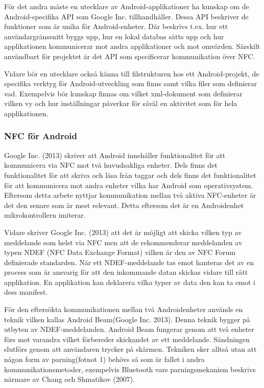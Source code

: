 \documentclass[11pt]{article}
\begin{document}

För det andra måste en utecklare av Android-applikationer ha kunskap om de Android-specifika API som Google Inc. tillhandhåller. Dessa API beskriver de funktioner som är unika för Android-enheter. Där beskrivs t.ex. hur ett användargränssnitt byggs upp, hur en lokal databas sätts upp och hur applikationen kommunicerar mot andra applikationer och mot omvärden. Särskilt användbart för projektet är det API som specificerar kommunikation över NFC.

Vidare bör en utecklare också känna till filstrukturen hos ett Android-projekt, de specifika verktyg för Android-utveckling som finns samt vilka filer som definierar vad. Exempelvis bör kunskap finnas om vilket xml-dokument som definierar vilken vy och hur inställningar påverkar för såväl en aktivitet som för hela applikationen.

\subsubsection{NFC för Android}
Google Inc. (2013) skriver att Android innehåller funktionalitet för att kommunicera via NFC mot två huvudsakliga enheter. Dels finns det funktionalitet för att skriva och läsa från taggar och dels finns det funktionalitet för att kommunicera mot andra enheter vilka har Android som operativsystem. Eftersom detta arbete nyttjar kommunikation mellan två aktiva NFC-enheter är det den senare som är mest relevant. Detta eftersom det är en Androidenhet mikrokontrollern imiterar.

Vidare skriver Google Inc. (2013) att det är möjligt att skicka vilken typ av meddelande som helst via NFC men att de rekommenderar meddelanden av typen NDEF (NFC Data Exchange Format) vilken är den av NFC Forum definierade standarden. När ett NDEF-meddelande tas emot hanteras det av en process som är ansvarig för att den inkommande datan skickas vidare till rätt applikation. En applikation kan deklarera vilka typer av data den kan ta emot i dess manifest.

För den eftersökta kommunikationen mellan två Androidenheter används en teknik vilken kallas Android Beam(Google Inc. 2013). Denna teknik bygger på utbyten av NDEF-meddelanden. Android Beam fungerar genom att två enheter förs mot varandra vilket förbereder skickandet av ett meddelande. Sändningen slutförs genom att användaren trycker på skärmen. Tekniken sker alltså utan att någon form av parning(fotnot 1) behövs så som är fallet i andra kommunikationsmetoder, exempelvis Bluetooth vars parningsmekanism beskrivs närmare av Chang och Shmatikov (2007).
\end{document}
